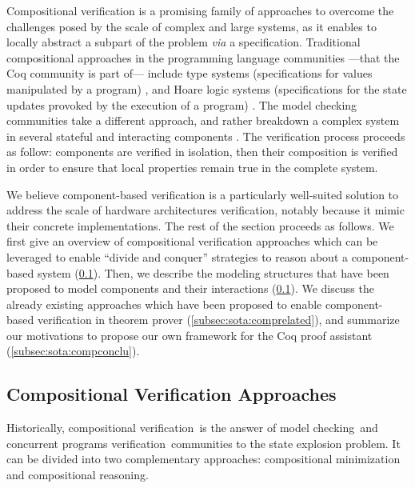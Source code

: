 Compositional verification is a promising family of approaches to overcome the
challenges posed by the scale of complex and large systems, as it enables to
locally abstract a subpart of the problem \emph{via} a specification.
%
Traditional compositional approaches in the programming language communities
---that the Coq community is part of--- include type
systems %
(specifications for values manipulated by a program) , and Hoare logic systems (specifications for the state
updates provoked by the execution of a program) .
%
The model checking communities take a different approach, and rather breakdown a
complex system in several stateful and interacting components .
%
The verification process proceeds as follow: components are verified in
isolation, then their composition is verified in order to ensure that local
properties remain true in the complete system.

We believe component-based verification is a particularly well-suited solution
to address the scale of hardware architectures verification, notably because it
mimic their concrete implementations.
%
The rest of the section proceeds as follows.
%
We first give an overview of compositional verification approaches which can be
leveraged to enable ``divide and conquer'' strategies to reason about a
component-based system (\ref{subsec:sota:compverif}).
%
Then, we describe the modeling structures that have been proposed to model
components and their interactions (\ref{subsec:sota:compverif}).
%
We discuss the already existing approaches which have been proposed to enable
component-based verification in theorem prover (\ref{subsec:sota:comprelated}),
and summarize our motivations to propose our own framework for the Coq proof
assistant (\ref{subsec:sota:compconclu}).

\subsection{Compositional Verification Approaches}
\label{subsec:sota:compverif}

Historically, compositional verification\,\cite{peng1998survey} is the answer of
model checking\,\cite{mcmillan1989compositional} and concurrent programs
verification\,\cite{jones1983tentative} communities to the state explosion
problem.
%
It can be divided into two complementary approaches: compositional minimization
and compositional reasoning.

